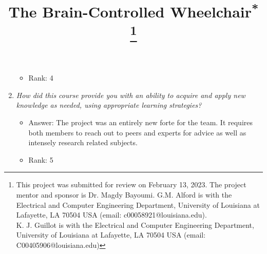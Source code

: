 \documentclass[conference]{IEEEtran}
\begin{document}
\begin{enumerate}
\begin{itemize}
        \item Rank: 4
        \vspace{.3cm}
    \end{itemize}
    \item \textit{How did this course provide you with an ability to acquire and apply new knowledge as needed, using appropriate learning strategies?}
    \begin{itemize}
        \vspace{.3cm}
        \item Answer: The project was an entirely new forte for the team. It requires both members to reach out to peers and experts for advice as well as intensely research related subjects.
        \item Rank: 5
        \vspace{.3cm}
    \end{itemize}
\end{enumerate}
\twocolumn

    

\title{The Brain-Controlled Wheelchair{\footnotesize \textsuperscript{*}}
\thanks{This project was submitted for review on February 13, 2023. The project mentor and sponsor is Dr. Magdy Bayoumi. G.M. Alford is with the Electrical and Computer Engineering Department, University of Louisiana at Lafayette, LA 70504 USA (email: c00058921@louisiana.edu).\\K. J. Guillot is with the Electrical and Computer Engineering Department, University of Louisiana at Lafayette, LA 70504 USA (email: C00405906@louisiana.edu)}
}
\author{

}

\maketitle
\thispagestyle{plain}
\pagestyle{plain}
\vspace{-7mm}
\end{document}
